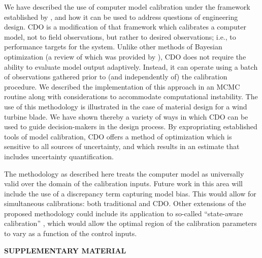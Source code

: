 \documentclass[12pt]{article}
\begin{document}
We have described the 
use of computer model calibration under the framework established by \cite{Kennedy2001}, and how it can be used to address questions of engineering design. 
%
CDO is a modification of that framework which calibrates a computer model, not to field observations, but rather to desired observations; i.e., to performance targets for the system. 
%
Unlike other methods of Bayesian optimization (a review of which was provided by \citealt{Shahriari2016}), CDO does not require the ability to evaluate model output adaptively.
%
Instead, it can operate using a batch of observations gathered prior to (and independently of) the calibration procedure.
%
We described the implementation of this approach in an MCMC routine along with considerations to accommodate computational instability.
%
The use of this methodology is illustrated in the case of material design for a wind turbine blade. 
%
We have shown thereby a variety of ways in which CDO can be used to guide decision-makers in the design process. 
%
By expropriating established tools of model calibration, CDO offers a method of optimization which is sensitive to all sources of uncertainty, and which results in an estimate that includes uncertainty quantification.

The methodology as described here treats the computer model as universally valid over the domain of the calibration inputs. 
%
Future work in this area will include the use of a discrepancy term capturing model bias.
%
This would allow for simultaneous calibrations: both traditional and CDO.
%
%
Other extensions of the proposed methodology could include its application to so-called ``state-aware calibration'' \citep{Atamturktur2015,Stevens2018,Brown2016}, which would allow the optimal region of the calibration parameters to vary as a function of the control inputs.



\bigskip
\begin{center}
{\large\bf SUPPLEMENTARY MATERIAL}
\end{center}
\end{document}
